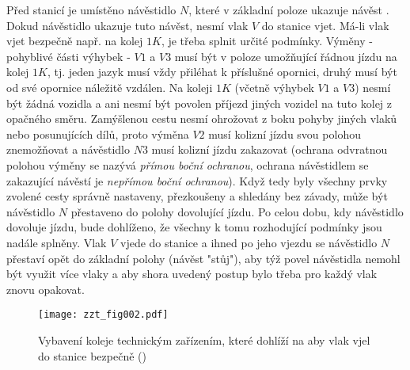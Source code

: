 {  Před stanicí je umístěno návěstidlo \(N\), které v základní poloze ukazuje návěst . Dokud
  návěstidlo ukazuje tuto návěst, nesmí vlak \(V\) do stanice vjet. Má-li vlak vjet bezpečně např. 
  na kolej \(1K\), je třeba splnit určité podmínky. Výměny - pohyblivé části výhybek - \(V1\) a 
  \(V3\) musí být v poloze umožňující řádnou jízdu na kolej \(1K\), tj. jeden jazyk musí
  vždy přiléhat k příslušné opornici, druhý musí být od své opornice náležitě vzdálen. Na koleji 
  \(1K\) (včetně výhybek \(V1\) a \(V3\)) nesmí být žádná vozidla a ani nesmí být povolen příjezd
  jiných vozidel na tuto kolej z opačného směru. Zamýšlenou cestu nesmí ohrožovat z boku pohyby 
  jiných vlaků nebo posunujících dílů, proto výměna \(V2\) musí kolizní jízdu svou polohou 
  znemožňovat a návěstidlo \(N3\) musí kolizní jízdu zakazovat (ochrana odvratnou polohou výměny se 
  nazývá \emph{přímou boční ochranou}, ochrana návěstidlem se zakazující návěstí je \emph{nepřímou 
  boční ochranou}). Když tedy byly všechny prvky zvolené cesty správně nastaveny, přezkoušeny a 
  shledány bez závady, může být návěstidlo \(N\) přestaveno do polohy dovolující jízdu. Po celou 
  dobu, kdy návěstidlo dovoluje jízdu, bude dohlíženo, že všechny k tomu rozhodující podmínky jsou 
  nadále splněny. Vlak \(V\) vjede do stanice a ihned po jeho vjezdu se návěstidlo \(N\) přestaví 
  opět do základní polohy (návěst "stůj"), aby týž povel návěstidla nemohl být využit více vlaky a 
  aby shora uvedený postup bylo třeba pro každý vlak znovu opakovat.

  \begin{figure}[ht!] %
    \centering
    \texttt{[image: zzt\_fig002.pdf]}
    \caption{Vybavení koleje technickým zařízením, které dohlíží na aby vlak vjel do stanice 
             bezpečně
             (\cite[s.~5]{Chudacek2005})}
    \label{zzt:fig002}
  \end{figure}
  
}
